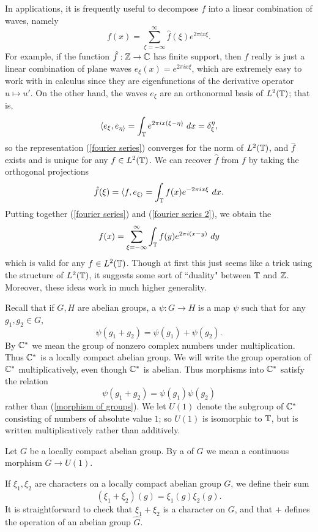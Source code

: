 In applications, it is frequently useful to decompose $f$ into a linear combination of waves, namely
\begin{equation}
\label{fourier series}
f(x) = \sum_{\xi=-\infty}^{\infty} \hat f(\xi) e^{2\pi ix\xi}.
\end{equation}
For example, if the function $\hat f: \mathbb{Z} \to \mathbb{C}$ has finite support, then $f$ really is just a linear combination of plane waves $e_\xi(x) = e^{2\pi i x\xi}$, which are extremely easy to work with in calculus since they are eigenfunctions of the derivative operator $u \mapsto u'$.
On the other hand, the waves $e_\xi$ are an orthonormal basis of $L^2(\mathbb{T})$; that is,
\[\langle e_\xi, e_{\eta\rangle} = \int_{\mathbb{T}} e^{2\pi i x(\xi - \eta)} ~dx = \delta_\xi^\eta,\]
so the representation (\ref{fourier series}) converges for the norm of $L^2(\mathbb{T})$, and $\hat f$ exists and is unique for any $f \in L^2(\mathbb{T})$.
We can recover $\hat f$ from $f$ by taking the orthogonal projections
\begin{equation}
\label{fourier series 2}
\hat f(\xi) = \langle f, e_{\xi\rangle} = \int_{\mathbb{T}} f(x) e^{-2\pi ix\xi} ~dx.
\end{equation}
Putting together (\ref{fourier series}) and (\ref{fourier series 2}), we obtain the 
\begin{equation}
\label{fourier series 3}
f(x) = \sum_{\xi = -\infty}^{\infty} \int_{\mathbb{T}} f(y) e^{2\pi i(x-y)}~dy
\end{equation}
which is valid for any $f \in L^2(\mathbb{T})$. Though at first this just seems like a trick using the structure of $L^2(\mathbb{T})$, it suggests some sort of ``duality" between $\mathbb{T}$ and $\mathbb{Z}$.
Moreover, these ideas work in much higher generality.

Recall that if $G,H$ are abelian groups, a  $\psi: G \to H$ is a map $\psi$ such that for any $g_1, g_2 \in G$,
\begin{equation}
\label{morphism of groups}
\psi(g_1 + g_2) = \psi(g_1) + \psi(g_2).
\end{equation}
By $\mathbb{C}^*$ we mean the group of nonzero complex numbers under multiplication. Thus $\mathbb{C}^*$ is a locally compact abelian group.
We will write the group operation of $\mathbb{C}^*$ multiplicatively, even though $\mathbb{C}^*$ is abelian. Thus morphisms into $\mathbb{C}^*$ satisfy the relation
\[\psi(g_1 + g_2) = \psi(g_1)\psi(g_2)\]
rather than (\ref{morphism of groups}).
We let $U(1)$ denote the subgroup of $\mathbb{C}^*$ consisting of numbers of absolute value $1$; so $U(1)$ is isomorphic to $\mathbb{T}$, but is written multiplicatively rather than additively.
\begin{definition}
Let $G$ be a locally compact abelian group.
By a  of $G$ we mean a continuous morphism $G \to U(1)$.
\end{definition}
If $\xi_1, \xi_2$ are characters on a locally compact abelian group $G$, we define their sum
\[(\xi_1 + \xi_2)(g) = \xi_1(g)\xi_2(g).\]
It is straightforward to check that $\xi_1 + \xi_2$ is a character on $G$, and that $+$ defines the operation of an abelian group $\hat G$.

